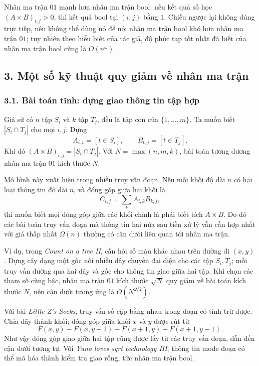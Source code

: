 \documentclass[11pt]{article}
\begin{document}
Nhân ma trận \(01\) mạnh hơn nhân ma trận bool: nếu kết quả số học
\((A\times B)_{i,j}>0\), thì kết quả bool tại \((i,j)\) bằng \(1\). Chiều ngược
lại không đúng trực tiếp, nên không thể dùng nó để nói nhân ma trận bool khó
hơn nhân ma trận \(01\); tuy nhiên theo hiểu biết của tác giả, độ phức tạp tốt
nhất đã biết của nhân ma trận bool cũng là \(O(n^\omega)\).

\subsection*{3. Một số kỹ thuật quy giảm về nhân ma trận}

\subsubsection*{3.1. Bài toán tĩnh: dựng giao thông tin tập hợp}

Giả sử có \(n\) tập \(S_i\) và \(k\) tập \(T_j\), đều là tập con của
\(\{1,\ldots,m\}\). Ta muốn biết \(|S_i\cap T_j|\) cho mọi \(i,j\). Dựng
\[
  A_{i,t}=[t\in S_i],\qquad B_{t,j}=[t\in T_j].
\]
Khi đó \((A\times B)_{i,j}=|S_i\cap T_j|\). Với
\(N=\max(n,m,k)\), bài toán tương đương nhân ma trận \(01\) kích thước \(N\).

Mô hình này xuất hiện trong nhiều truy vấn đoạn. Nếu mỗi khối độ dài \(n\) có
hai loại thông tin độ dài \(n\), và đóng góp giữa hai khối là
\[
  C_{i,j}=\sum_k A_{i,k}B_{k,j},
\]
thì muốn biết mọi đóng góp giữa các khối chính là phải biết tích \(A\times B\).
Do đó các bài toán truy vấn đoạn mà thông tin hai nửa sau tiền xử lý vẫn cần
hợp nhất với giá thấp nhất \(\Omega(n)\) thường có cận dưới liên quan tới nhân
ma trận.

Ví dụ, trong \emph{Count on a tree II}, cần hỏi số màu khác nhau trên đường đi
\((x,y)\). Dựng cây dạng một gốc nối nhiều dây chuyền đại diện cho các tập
\(S_i,T_j\); mỗi truy vấn đường qua hai dây và gốc cho thông tin giao giữa hai
tập. Khi chọn các tham số cùng bậc, nhân ma trận \(01\) kích thước \(\sqrt N\)
quy giảm về bài toán kích thước \(N\), nên cận dưới tương ứng là
\(O(N^{\omega/2})\).

Với bài \emph{Little Z's Socks}, truy vấn số cặp bằng nhau trong đoạn có tính
trừ được. Chia dãy thành khối; đóng góp giữa khối \(x\) và \(y\) được rút từ
\[
  F(x,y)-F(x,y-1)-F(x+1,y)+F(x+1,y-1).
\]
Như vậy đóng góp giao giữa hai tập cũng được lấy từ các truy vấn đoạn, dẫn đến
cận dưới tương tự. Với \emph{Yuno loves sqrt technology III}, thông tin mode
đoạn có thể mã hóa thành kiểm tra giao rỗng, tức nhân ma trận bool.
\end{document}
